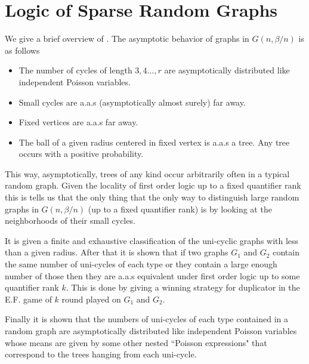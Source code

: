 \documentclass[11pt,notitlepage,a4paper]{article}
\theoremstyle{definition}
\begin{document}
\clearpage




\section{Logic of Sparse Random Graphs}

We give a brief overview of \cite{lynch1992probabilities}.
The asymptotic behavior of graphs in $G(n,\beta/n)$ is as follows
	\begin{itemize}
	\item The number of cycles of 
	length $3,4\dots, r$
	are asymptotically distributed like independent Poisson 
	variables.
	\item Small cycles are a.a.s (asymptotically almost surely) far away.
	\item Fixed vertices are a.a.s far away.
	\item The ball of a given radius centered in fixed
	vertex is a.a.s a tree. Any tree occurs with a positive 
	probability.
\end{itemize}

This way, asymptotically, trees of any kind occur arbitrarily often in a typical
random graph. Given the locality of first order logic up to a fixed 
quantifier rank this is tells us that the only thing that the only way 
to distinguish large random graphs in $G(n,\beta/n)$ 
(up to a fixed quantifier rank) 
is by looking at the neighborhoods of their small cycles. \par

It is given a finite and exhaustive classification of the uni-cyclic
graphs with less than a given radius. After that it is shown that
if two graphs $G_1$ and $G_2$ contain the same number 
of uni-cycles of each type or they
contain a large enough number of those then they are a.a.s equivalent
under first order logic up to some quantifier rank $k$. This is done by giving
a winning strategy for duplicator in the E.F. game of $k$ round played on 
$G_1$ and $G_2$.\par

Finally it is shown that the numbers of uni-cycles of each type contained in
a random graph are asymptotically distributed like independent Poisson variables 
whose means are given by some other nested ``Poisson expressions" that correspond 
to the trees hanging from each uni-cycle. 
\end{document}
